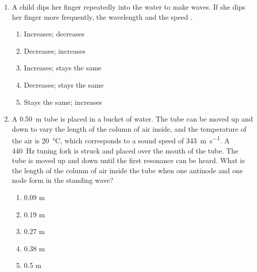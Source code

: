 \documentclass{../../../oss-classkick}
\begin{document}
\begin{multicols}{2}
\begin{enumerate}[leftmargin=18pt]
  \item A child dips her finger repeatedly into the water to make waves. If she
    dips her finger more frequently, the wavelength \underline{\hspace{.3in}}
    and the speed \underline{\hspace{.3in}}.
    \begin{enumerate}[nosep,leftmargin=18pt,label=(\Alph*)]
    \item Increases; decreases
    \item Decreases; increases
    \item Increases; stays the same
    \item Decreases; stays the same
    \item Stays the same; increases
    \end{enumerate}
    \vspace{.7in}
    
  \item A \SI{.50}{\metre} tube is placed in a bucket of water. The tube can be
    moved up and down to vary the length of the column of air inside, and the
    temperature of the air is \SI{20}{\celsius}, which corresponds to a sound
    speed of \SI{343}{\metre\per\second}. A \SI{440}{\hertz} tuning fork is
    struck and placed over the mouth of the tube. The tube is moved up and down
    until the first resonance can be heard. What is the length of the column of
    air inside the tube when one antinode and one node form in the standing
    wave?
    \begin{enumerate}[nosep,leftmargin=18pt,label=(\Alph*)]
    \item 0.09 m
    \item 0.19 m
    \item 0.27 m
    \item 0.38 m
    \item 0.5 m
    \end{enumerate}

  \end{enumerate}
  

\end{multicols}
\end{document}

